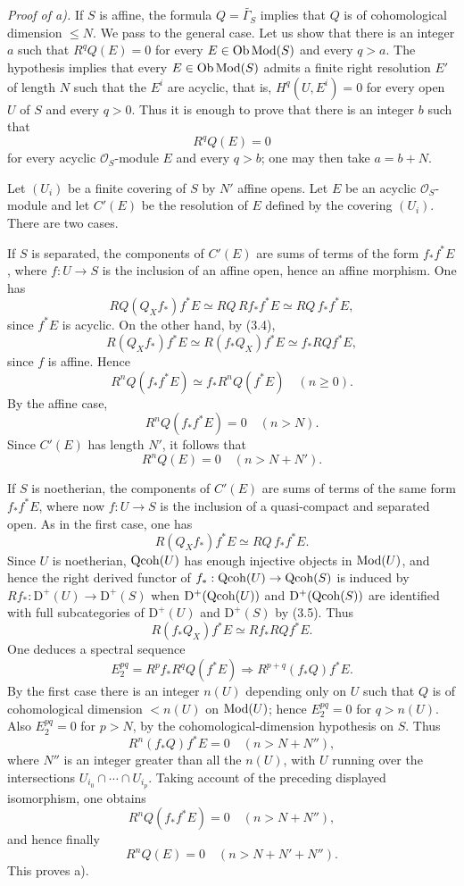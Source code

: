 \documentclass[11pt]{article}
\begin{document}
\emph{Proof of a).} If $S$ is affine, the formula $Q=\widetilde{\Gamma_S}$ implies that $Q$ is of cohomological dimension $\leq N$. We pass to the general case. Let us show that there is an integer $a$ such that $R^qQ(E)=0$ for every $E\in\operatorname{Ob}\operatorname{Mod}(S)$ and every $q>a$. The hypothesis implies that every $E\in\operatorname{Ob}\operatorname{Mod}(S)$ admits a finite right resolution $E'$ of length $N$ such that the $E^i$ are acyclic, that is, $H^q(U,E^i)=0$ for every open $U$ of $S$ and every $q>0$. Thus it is enough to prove that there is an integer $b$ such that
\[
 R^qQ(E)=0
\]
for every acyclic $\mathcal O_S$-module $E$ and every $q>b$; one may then take $a=b+N$.

Let $(U_i)$ be a finite covering of $S$ by $N'$ affine opens. Let $E$ be an acyclic $\mathcal O_S$-module and let $C'(E)$ be the resolution of $E$ defined by the covering $(U_i)$. There are two cases.

If $S$ is separated, the components of $C'(E)$ are sums of terms of the form $f_*f^*E$, where $f:U\to S$ is the inclusion of an affine open, hence an affine morphism. One has
\[
 RQ(Q_Xf_*)f^*E\simeq RQ\,Rf_*f^*E\simeq RQ\,f_*f^*E,
\]
since $f^*E$ is acyclic. On the other hand, by (3.4),
\[
 R(Q_Xf_*)f^*E\simeq R(f_*Q_X)f^*E\simeq f_*RQf^*E,
\]
since $f$ is affine. Hence
\[
 R^nQ(f_*f^*E)\simeq f_*R^nQ(f^*E)\quad(n\geq0).
\]
By the affine case,
\[
 R^nQ(f_*f^*E)=0\quad(n>N).
\]
Since $C'(E)$ has length $N'$, it follows that
\[
 R^nQ(E)=0\quad(n>N+N').
\]

If $S$ is noetherian, the components of $C'(E)$ are sums of terms of the same form $f_*f^*E$, where now $f:U\to S$ is the inclusion of a quasi-compact and separated open. As in the first case, one has
\[
 R(Q_Xf_*)f^*E\simeq RQ\,f_*f^*E.
\]
Since $U$ is noetherian, $\operatorname{Qcoh}(U)$ has enough injective objects in $\operatorname{Mod}(U)$, and hence the right derived functor of $f_*:\operatorname{Qcoh}(U)\to\operatorname{Qcoh}(S)$ is induced by $Rf_*:\mathrm D^+(U)\to\mathrm D^+(S)$ when $\mathrm D^+(\operatorname{Qcoh}(U))$ and $\mathrm D^+(\operatorname{Qcoh}(S))$ are identified with full subcategories of $\mathrm D^+(U)$ and $\mathrm D^+(S)$ by (3.5). Thus
\[
 R(f_*Q_X)f^*E\simeq Rf_*RQf^*E.
\]
One deduces a spectral sequence
\[
 E_2^{pq}=R^pf_*R^qQ(f^*E)\Longrightarrow R^{p+q}(f_*Q)f^*E.
\]
By the first case there is an integer $n(U)$ depending only on $U$ such that $Q$ is of cohomological dimension $<n(U)$ on $\operatorname{Mod}(U)$; hence $E_2^{pq}=0$ for $q>n(U)$. Also $E_2^{pq}=0$ for $p>N$, by the cohomological-dimension hypothesis on $S$. Thus
\[
 R^n(f_*Q)f^*E=0\quad(n>N+N''),
\]
where $N''$ is an integer greater than all the $n(U)$, with $U$ running over the intersections $U_{i_0}\cap\cdots\cap U_{i_p}$. Taking account of the preceding displayed isomorphism, one obtains
\[
 R^nQ(f_*f^*E)=0\quad(n>N+N''),
\]
and hence finally
\[
 R^nQ(E)=0\quad(n>N+N'+N'').
\]
This proves a).
\end{document}
